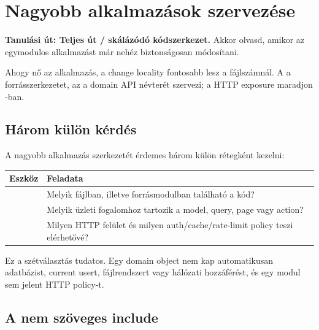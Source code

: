 \chapter{Nagyobb alkalmazások szervezése}

\noindent\textbf{Tanulási út: Teljes út / skálázódó kódszerkezet.} Akkor olvasd, amikor az egymodulos alkalmazást már nehéz biztonságosan módosítani.\par\medskip



Ahogy nő az alkalmazás, a change locality fontosabb lesz a fájlszámnál. A  a forrásszerkezetet, az  a domain API névterét szervezi; a HTTP exposure maradjon -ban.

\section{Három külön kérdés}

A nagyobb alkalmazás szerkezetét érdemes három külön rétegként kezelni:

\begin{center}
\begin{tabularx}{\textwidth}{@{}l Y@{}}
\toprule
\textbf{Eszköz} & \textbf{Feladata} \\
\midrule
{} & Melyik fájlban, illetve forrásmodulban található a kód? \\
 & Melyik üzleti fogalomhoz tartozik a model, query, page vagy action? \\
 & Milyen HTTP felület és milyen auth/cache/rate-limit policy teszi elérhetővé? \\
\bottomrule
\end{tabularx}
\end{center}

Ez a szétválasztás tudatos. Egy domain object nem kap automatikusan adatbázist, current usert, fájlrendszert vagy hálózati hozzáférést, és egy modul sem jelent HTTP policy-t.

\section{A  nem szöveges include}

